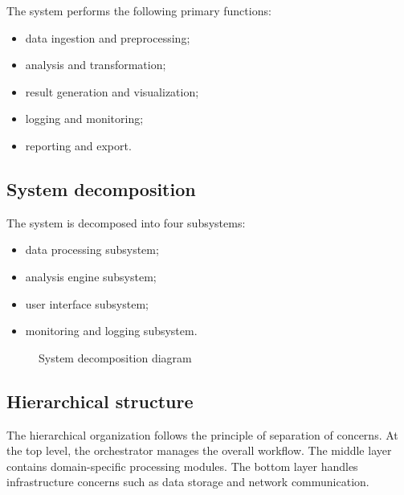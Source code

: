 The system performs the following primary functions:
\begin{itemize}
    \item data ingestion and preprocessing;
    \item analysis and transformation;
    \item result generation and visualization;
    \item logging and monitoring;
    \item reporting and export.
\end{itemize}

\subsection{System decomposition}

The system is decomposed into four subsystems:
\begin{itemize}
    \item data processing subsystem;
    \item analysis engine subsystem;
    \item user interface subsystem;
    \item monitoring and logging subsystem.
\end{itemize}

\begin{figure}[H]
    \centering
    \caption{System decomposition diagram} \label{fig:decomposition}
\end{figure}

\subsection{Hierarchical structure}

The hierarchical organization follows the principle of separation of concerns.
At the top level, the orchestrator manages the overall workflow.
The middle layer contains domain-specific processing modules.
The bottom layer handles infrastructure concerns such as data storage and network communication.

